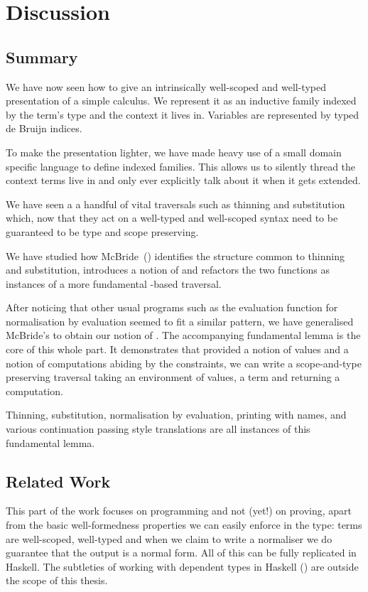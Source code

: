 \chapter{Discussion}
\label{chapter:program-conclusion}

\section{Summary}

We have now seen how to give an intrinsically well-scoped and well-typed
presentation of a simple calculus. We represent it as an inductive family
indexed by the term's type and the context it lives in. Variables are
represented by typed de Bruijn indices.

To make the presentation lighter, we have made heavy use of a small domain
specific language to define indexed families. This allows us to silently
thread the context terms live in and only ever explicitly talk about it
when it gets extended.

We have seen a a handful of vital traversals such as thinning and substitution
which, now that they act on a well-typed and well-scoped syntax need to be
guaranteed to be type and scope preserving.

We have studied how McBride~(\citeyear{mcbride2005type}) identifies the
structure common to thinning and substitution, introduces a notion of 
and refactors the two functions as instances of a more fundamental
-based traversal.

After noticing that other usual programs such as the evaluation function
for normalisation by evaluation seemed to fit a similar pattern, we have
generalised McBride's  to obtain our notion of .
%
The accompanying fundamental lemma is the core of this whole part. It
demonstrates that provided a notion of values and a notion of computations
abiding by the  constraints, we can write a scope-and-type
preserving traversal taking an environment of values, a term and returning
a computation.

Thinning, substitution, normalisation by evaluation, printing with names, and
various continuation passing style translations are all instances of this
fundamental lemma.

\section{Related Work}

This part of the work focuses on programming and not (yet!) on proving,
apart from the basic well-formedness properties we can easily enforce
in the type: terms are well-scoped, well-typed and when we claim to write
a normaliser we do guarantee that the output is a normal form. All of this
can be fully replicated in Haskell.
The subtleties of working with dependent types in Haskell
(\cite{lindley2014hasochism}) are outside the scope of this thesis.

